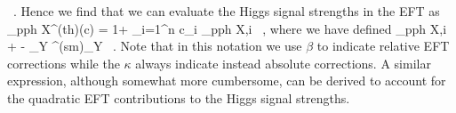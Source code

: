  \rc \, .
 \ee
 Hence we find that we can evaluate the Higgs signal strengths in the EFT as
   \be
 \mu_{pp\to h \to X}^{\rm (th)}({\boldsymbol c}) =
 1+ \sum_{i=1}^{n} c_i \beta_{pp\to h \to X,i}  \, ,
 \ee
 where we have defined
 \be
\beta_{pp\to h \to X,i} \equiv {}
 +
  -
 \sum_Y \lp {}^{(\rm sm)}_Y \rp \, .
 \ee
 Note that in this notation we use $\beta$ to indicate relative
 EFT corrections while the $\kappa$ always indicate instead
  absolute corrections.
  A similar expression, although somewhat more cumbersome, can be derived to account
  for the quadratic EFT contributions to the Higgs signal strengths.
  
